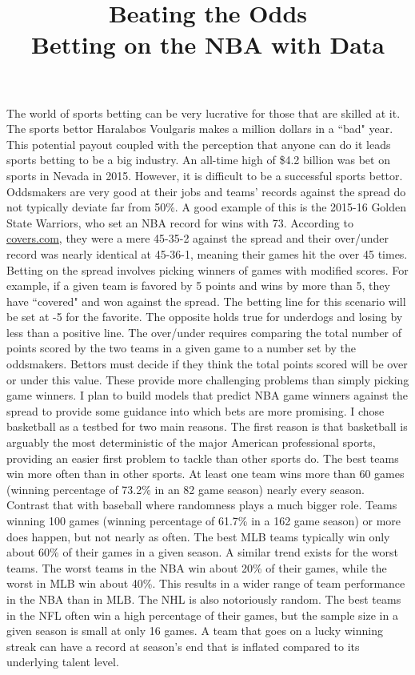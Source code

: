 \documentclass{article}
\title{Beating the Odds \\ Betting on the NBA with Data}
\date{\vspace{-5ex}}
\begin{document}
\maketitle
The world of sports betting can be very lucrative for those that are skilled at it. The sports bettor Haralabos Voulgaris makes a million dollars in a ``bad" year. This potential payout coupled with the perception that anyone can do it leads sports betting to be a big industry. An all-time high of \$4.2 billion was bet on sports in Nevada in 2015. However, it is difficult to be a successful sports bettor. Oddsmakers are very good at their jobs and teams' records against the spread do not typically deviate far from 50\%. A good example of this is the 2015-16 Golden State Warriors, who set an NBA record for wins with 73. According to \href{http://www.covers.com/pageLoader/pageLoader.aspx?page=/data/nba/standings/2015-2016/sortable/standings_wins.html}{covers.com}, they were a mere 45-35-2 against the spread and their over/under record was nearly identical at 45-36-1, meaning their games hit the over 45 times. Betting on the spread involves picking winners of games with modified scores. For example, if a given team is favored by 5 points and wins by more than 5, they have ``covered" and won against the spread. The betting line for this scenario will be set at -5 for the favorite. The opposite holds true for underdogs and losing by less than a positive line. The over/under requires comparing the total number of points scored by the two teams in a given game to a number set by the oddsmakers. Bettors must decide if they think the total points scored will be over or under this value. These provide more challenging problems than simply picking game winners. I plan to build models that predict NBA game winners against the spread to provide some guidance into which bets are more promising.
\bigbreak
I chose basketball as a testbed for two main reasons. The first reason is that basketball is arguably the most deterministic of the major American professional sports, providing an easier first problem to tackle than other sports do. The best teams win more often than in other sports. At least one team wins more than 60 games (winning percentage of 73.2\% in an 82 game season) nearly every season. Contrast that with baseball where randomness plays a much bigger role. Teams winning 100 games (winning percentage of 61.7\% in a 162 game season) or more does happen, but not nearly as often. The best MLB teams typically win only about 60\% of their games in a given season. A similar trend exists for the worst teams. The worst teams in the NBA win about 20\% of their games, while the worst in MLB win about 40\%. This results in a wider range of team performance in the NBA than in MLB. The NHL is also notoriously random. The best teams in the NFL often win a high percentage of their games, but the sample size in a given season is small at only 16 games. A team that goes on a lucky winning streak can have a record at season's end that is inflated compared to its underlying talent level.
\end{document}
